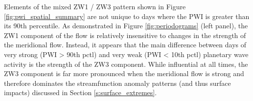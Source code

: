 Elements of the mixed ZW1 / ZW3 pattern shown in Figure \ref{fig:pwi_spatial_summary} are not unique to days where the PWI is greater than its 90th percentile. As demonstrated in Figure \ref{fig:periodograms} (left panel), the ZW1 component of the flow is relatively insensitive to changes in the strength of the meridional flow. Instead, it appears that the main difference between days of very strong (PWI > 90th pctl) and very weak (PWI < 10th pctl) planetary wave activity is the strength of the ZW3 component. While influential at all times, the ZW3 component is far more pronounced when the meridional flow is strong and therefore dominates the streamfunction anomaly patterns (and thus surface impacts) discussed in Section \ref{s:surface_extremes}.
